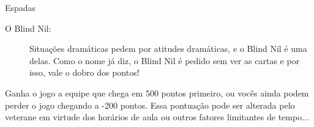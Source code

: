 \begin{subsecao}{Espadas}
\begin{description}
\item[O Blind Nil:]
Situações dramáticas pedem por atitudes dramáticas, e o Blind Nil é uma delas.
Como o nome já diz, o Blind Nil é pedido sem ver as cartas e por isso, vale o
dobro dos pontos!

\end{description}
Ganha o jogo a equipe que chega em 500 pontos primeiro, ou vocês ainda podem
perder o jogo chegando a -200 pontos. Essa pontuação pode ser alterada pelo
veterane em virtude dos horários de aula ou outros fatores limitantes de
tempo...

\end{subsecao}
